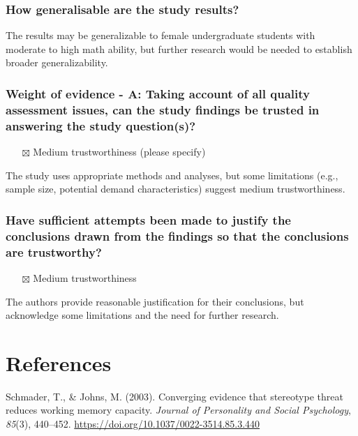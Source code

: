 \documentclass[
  doc, a4paper]{apa7}
\providecommand{\tightlist}{%
  \setlength{\itemsep}{0pt}\setlength{\parskip}{0pt}}
\newlength{\cslhangindent}
\newenvironment{CSLReferences}[2] %
 {\begin{list}{}{%
  \setlength{\itemindent}{0pt}
  \setlength{\leftmargin}{0pt}
  \setlength{\parsep}{0pt}
  \ifodd #1
   \setlength{\leftmargin}{\cslhangindent}
   \setlength{\itemindent}{-1\cslhangindent}
  \fi
  \setlength{\itemsep}{#2\baselineskip}}}
 {\end{list}}
\begin{document}
\subsubsection{How generalisable are the study results?}\label{how-generalisable-are-the-study-results}

The results may be generalizable to female undergraduate students with moderate to high math ability, but further research would be needed to establish broader generalizability.

\subsubsection{Weight of evidence - A: Taking account of all quality assessment issues, can the study findings be trusted in answering the study question(s)?}\label{weight-of-evidence---a-taking-account-of-all-quality-assessment-issues-can-the-study-findings-be-trusted-in-answering-the-study-questions}

\begin{itemize}
\tightlist
\item[$\boxtimes$]
  Medium trustworthiness (please specify)
\end{itemize}

The study uses appropriate methods and analyses, but some limitations (e.g., sample size, potential demand characteristics) suggest medium trustworthiness.

\subsubsection{Have sufficient attempts been made to justify the conclusions drawn from the findings so that the conclusions are trustworthy?}\label{have-sufficient-attempts-been-made-to-justify-the-conclusions-drawn-from-the-findings-so-that-the-conclusions-are-trustworthy}

\begin{itemize}
\tightlist
\item[$\boxtimes$]
  Medium trustworthiness
\end{itemize}

The authors provide reasonable justification for their conclusions, but acknowledge some limitations and the need for further research.

\section{References}\label{references}

\label{refs}
\begin{CSLReferences}{1}{0}
Schmader, T., \& Johns, M. (2003). Converging evidence that stereotype threat reduces working memory capacity. \emph{Journal of Personality and Social Psychology}, \emph{85}(3), 440--452. \url{https://doi.org/10.1037/0022-3514.85.3.440}

\end{CSLReferences}
\end{document}
